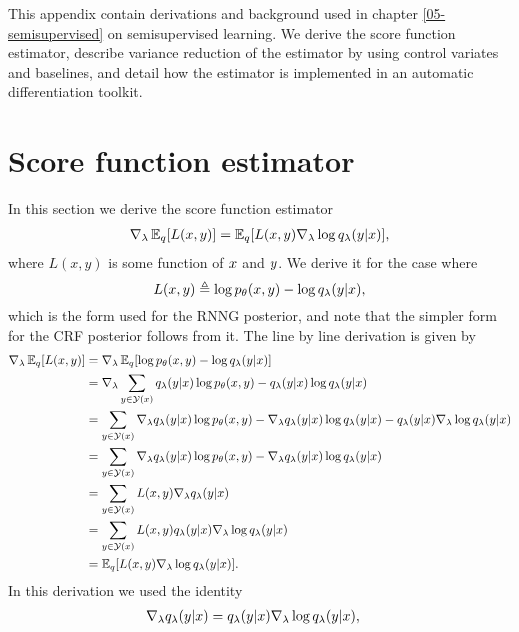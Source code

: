 This appendix contain derivations and background used in chapter \ref{05-semisupervised} on semisupervised learning. We derive the score function estimator, describe variance reduction of the estimator by using control variates and baselines, and detail how the estimator is implemented in an automatic differentiation toolkit.

\section{Score function estimator}
  In this section we derive the score function estimator
  \begin{align}
    \label{eq:score-function-estimator}
    \nabla_{\lambda} \operatorname{\mathbb{E}}_{q} [ L(x, y) ] = \operatorname{\mathbb{E}}_{q} [ L(x, y) \nabla_{\lambda} \log q_{\lambda}(y | x) ],
  \end{align}
  where $L(x, y)$ is some function of $x$ and $y$. We derive it for the case where
  \begin{equation*}
    L(x, y) \triangleq \log p_{\theta}(x, y) - \log q_{\lambda}(y | x),
  \end{equation*}
  which is the form used for the RNNG posterior, and note that the simpler form for the CRF posterior follows from it. The line by line derivation is given by
  \begin{align*}
    \nabla_{\lambda} \operatorname{\mathbb{E}}_{q} [ L(x, y) ] &=
    \nabla_{\lambda} \operatorname{\mathbb{E}}_{q} [ \log p_{\theta}(x, y) - \log q_{\lambda}(y | x) ] \\
      &= \nabla_{\lambda} \sum_{y \in \mathcal{Y}(x)} q_{\lambda}(y | x) \log p_{\theta}(x, y) - q_{\lambda}(y | x)\log q_{\lambda}(y | x) \\
      &= \sum_{y \in \mathcal{Y}(x)} \nabla_{\lambda} q_{\lambda}(y | x) \log p_{\theta}(x, y)  - \nabla_{\lambda} q_{\lambda}(y | x)\log q_{\lambda}(y | x) -  q_{\lambda}(y | x)\nabla_{\lambda}\log q_{\lambda}(y | x) \\
      &= \sum_{y \in \mathcal{Y}(x)} \nabla_{\lambda} q_{\lambda}(y | x) \log p_{\theta}(x, y) - \nabla_{\lambda} q_{\lambda}(y | x)\log q_{\lambda}(y | x) \\
      &= \sum_{y \in \mathcal{Y}(x)} L(x, y)\nabla_{\lambda} q_{\lambda}(y | x) \\
      &= \sum_{y \in \mathcal{Y}(x)} L(x, y) q_{\lambda}(y | x) \nabla_{\lambda} \log q_{\lambda}(y | x)   \\
      &= \operatorname{\mathbb{E}}_{q} [ L(x, y) \nabla_{\lambda} \log q_{\lambda}(y | x) ].
  \end{align*}
  In this derivation we used the identity
  \begin{align*}
    \nabla_{\lambda} q_{\lambda}(y | x) &= q_{\lambda}(y | x)\nabla_{\lambda}\log q_{\lambda}(y | x),
  \end{align*}
